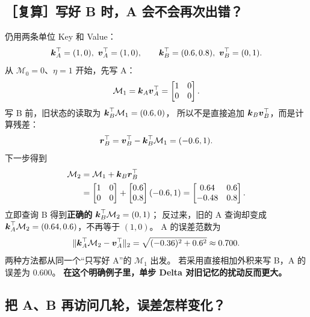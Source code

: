 \subsection{［复算］写好 B 时，A 会不会再次出错？}

仍用两条单位 Key 和 Value：
\[
\vect{k}_A^\top=(1,0),\ \vect{v}_A^\top=(1,0),\qquad
\vect{k}_B^\top=(0.6,0.8),\ \vect{v}_B^\top=(0,1).
\]
从 $\mathcal{M}_0=0$、$\eta=1$ 开始，先写 A：
\[
\mathcal{M}_1=\boldsymbol{k}_A \boldsymbol{v}_A^\top=\begin{bmatrix}1&0\\0&0\end{bmatrix}.
\]
写 B 前，旧状态的读取为 $\boldsymbol{k}_B^\top\mathcal{M}_1=(0.6,0)$，
所以不是直接追加 $\boldsymbol{k}_B \boldsymbol{v}_B^\top$，而是计算残差：
\[
\boldsymbol{r}_B^\top=\boldsymbol{v}_B^\top-\boldsymbol{k}_B^\top\mathcal{M}_1=(-0.6,1).
\]
下一步得到
\begin{equation}
\begin{aligned}
\mathcal{M}_2&=\mathcal{M}_1+\boldsymbol{k}_B \boldsymbol{r}_B^\top\\
&=\begin{bmatrix}1&0\\0&0\end{bmatrix}
+\begin{bmatrix}0.6\\0.8\end{bmatrix}(-0.6,1)
=\begin{bmatrix}0.64&0.6\\-0.48&0.8\end{bmatrix}.
\end{aligned}
\label{eq:delta-overwrites-key-a}
\end{equation}
立即查询 B 得到\textbf{正确的} $\boldsymbol{k}_B^\top\mathcal{M}_2=(0,1)$；
反过来，旧的 A 查询却变成
$\boldsymbol{k}_A^\top\mathcal{M}_2=(0.64,0.6)$，不再等于 $(1,0)$。
A 的误差范数为
\[
\|\boldsymbol{k}_A^\top\mathcal{M}_2-\boldsymbol{v}_A^\top\|_2=\sqrt{(-0.36)^2+0.6^2}
\approx0.700.
\]
两种方法都从同一个“只写好 A”的 $\mathcal{M}_1$ 出发。
若采用直接相加外积来写 B，A 的误差为 $0.600$。
\textbf{在这个明确例子里，单步 Delta 对旧记忆的扰动反而更大。}

\subsection{把 A、B 再访问几轮，误差怎样变化？}
\label{sec:delta-revisit}


